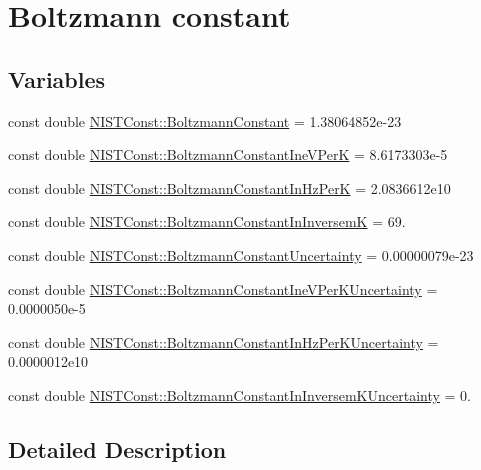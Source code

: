 \hypertarget{group___boltzmann_constant}{}\section{Boltzmann constant}
\label{group___boltzmann_constant}
\subsection*{Variables}
\begin{DoxyCompactItemize}
\item 
const double \hyperlink{group___boltzmann_constant_ga505057a2eb7e925fde668cc1025331df}{N\+I\+S\+T\+Const\+::\+Boltzmann\+Constant} = 1.\+38064852e-\/23
\item 
const double \hyperlink{group___boltzmann_constant_gad31ba56bbe6d4a0f40252ef7b48b52a3}{N\+I\+S\+T\+Const\+::\+Boltzmann\+Constant\+Ine\+V\+PerK} = 8.\+6173303e-\/5
\item 
const double \hyperlink{group___boltzmann_constant_ga5c59003e6fbd70482ee1bdaf7ea35b7a}{N\+I\+S\+T\+Const\+::\+Boltzmann\+Constant\+In\+Hz\+PerK} = 2.\+0836612e10
\item 
const double \hyperlink{group___boltzmann_constant_ga4f4d8adf824657420f54680daa6340d5}{N\+I\+S\+T\+Const\+::\+Boltzmann\+Constant\+In\+InversemK} = 69.
\item 
const double \hyperlink{group___boltzmann_constant_gaa32ac947c545e70076f0e08aceb3ce16}{N\+I\+S\+T\+Const\+::\+Boltzmann\+Constant\+Uncertainty} = 0.\+00000079e-\/23
\item 
const double \hyperlink{group___boltzmann_constant_ga6a1c42c4e69994962116d279d6f49203}{N\+I\+S\+T\+Const\+::\+Boltzmann\+Constant\+Ine\+V\+Per\+K\+Uncertainty} = 0.\+0000050e-\/5
\item 
const double \hyperlink{group___boltzmann_constant_gaa87e06f419f94e4ea1ac8dcd769537ee}{N\+I\+S\+T\+Const\+::\+Boltzmann\+Constant\+In\+Hz\+Per\+K\+Uncertainty} = 0.\+0000012e10
\item 
const double \hyperlink{group___boltzmann_constant_gadb520d4ce5d980c8ba24d9499f500873}{N\+I\+S\+T\+Const\+::\+Boltzmann\+Constant\+In\+Inversem\+K\+Uncertainty} = 0.
\end{DoxyCompactItemize}


\subsection{Detailed Description}


